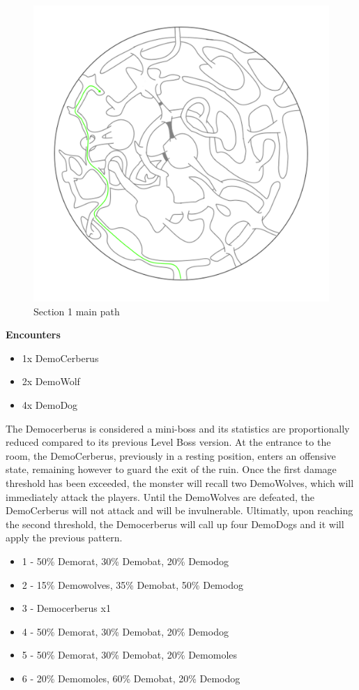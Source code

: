 \begin{figure}[H]
	\centering
	\includegraphics[width=0.7\linewidth]{images/map/map_principle_path_section_01.png}
	\caption*{Section 1 main path}
\end{figure}

\textbf{Encounters}
\begin{itemize}
	\item 1x DemoCerberus
	\item 2x DemoWolf
	\item 4x DemoDog
\end{itemize}
The Democerberus is considered a mini-boss and its statistics are proportionally reduced compared to its previous Level Boss version. At the entrance to the room, the DemoCerberus, previously in a resting position, enters an offensive state, remaining however to guard the exit of the ruin. Once the first damage threshold has been exceeded, the monster will recall two DemoWolves, which will immediately attack the players. Until the DemoWolves are defeated, the DemoCerberus will not attack and will be invulnerable. Ultimatly, upon reaching the second threshold, the Democerberus will call up four DemoDogs and it will apply the previous pattern.

\begin{itemize}
	\item 1 - 50\% Demorat, 30\% Demobat, 20\% Demodog
	\item 2 - 15\% Demowolves, 35\% Demobat, 50\% Demodog
	\item 3 - Democerberus x1
	\item 4 - 50\% Demorat, 30\% Demobat, 20\% Demodog
	\item 5 - 50\% Demorat, 30\% Demobat, 20\% Demomoles
	\item 6 - 20\% Demomoles, 60\% Demobat, 20\% Demodog
\end{itemize}

